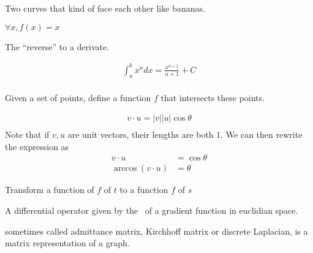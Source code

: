 \begin{definition}[Hyperbolic]
    Two curves that kind of face each other like bananas.
\end{definition}

\begin{definition}
    $\forall{x}, f(x) = x$
\end{definition}

\begin{definition}[Integral]
    The ``reverse'' to a derivate. 

    \begin{align}
        \int_{a}^{b}x^{n} dx = \frac{x^{n+1}}{n+1} + C \\
    \end{align}

\end{definition}

\begin{definition}
    Given a set of points, define a function $f$ that intersects these points.
\end{definition}

\begin{definition}
    \begin{align*}
        v \cdot u = |v||u|\cos{\theta} \\
    \end{align*}
    Note that if $v, u$ are unit vectors, their lengths are both 1.
    We can then rewrite the expression as
    \begin{align*}
        v \cdot u &= \cos{\theta} \\
        \arccos{(v \cdot u)} &= \theta
    \end{align*}
\end{definition}

\begin{definition}
    Transform a function of $f$ of $t$ to a function $f$ of $s$

    A differential operator given by the~ of a gradient 
    function in euclidian space.
\end{definition}

\begin{definition}
    sometimes called admittance matrix, Kirchhoff matrix or discrete Laplacian,
    is a matrix representation of a graph.

\end{definition}

